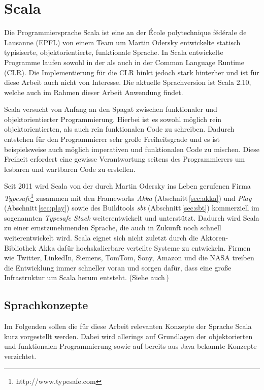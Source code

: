 \section{Scala}

Die Programmiersprache Scala ist eine an der École polytechnique fédérale de Lausanne (EPFL) von
einem Team um Martin Odersky entwickelte statisch typisiserte,  objektorientierte, funktionale
Sprache. In Scala entwickelte Programme laufen  sowohl in der  als auch in der Common
Language Runtime (CLR). Die Implementierung für die CLR hinkt jedoch stark  hinterher und ist für
diese Arbeit auch nicht von Interesse. Die aktuelle Sprachversion ist Scala 2.10, welche auch im
Rahmen dieser Arbeit Anwendung findet.

Scala versucht von Anfang an den Spagat zwischen funktionaler und  objektorientierter
Programmierung. Hierbei ist es sowohl möglich  rein objektorientierten, als auch rein funktionalen
Code zu schreiben. Dadurch  entstehen für den Programmierer sehr große Freiheitsgrade und es ist
beispielsweise auch möglich imperativen und funktionalen Code zu mischen. Diese  Freiheit erfordert
eine gewisse Verantwortung seitens des Programmierers um  lesbaren und wartbaren Code zu erstellen.

Seit 2011 wird Scala von der durch Martin Odersky ins Leben gerufenen Firma
\textit{Typesafe}\footnote{http://www.typesafe.com} zusammen mit den Frameworks \textit{Akka}
(Abschnitt\,\ref{sec:akka}) und \textit{Play} (Abschnitt\,\ref{sec:play}) sowie des Buildtools
\textit{sbt} (Abschnitt\,\ref{sec:sbt}) kommerziell im sogenannten \textit{Typesafe Stack}
weiterentwickelt und unterstützt. Dadurch wird Scala zu einer ernstzunehmenden Sprache, die auch in
Zukunft noch schnell weiterentwickelt wird. Scala eignet sich nicht zuletzt durch die Aktoren-
Bibliothek Akka dafür hochskalierbare verteilte Systeme zu entwickeln. Firmen wie Twitter, LinkedIn,
Siemens, TomTom, Sony, Amazon und die NASA treiben die Entwicklung immer schneller voran und sorgen
dafür, dass eine große Infrastruktur um Scala herum entsteht. (Siehe auch\,\cite{scala})

\subsection{Sprachkonzepte}

Im Folgenden sollen die für diese Arbeit relevanten Konzepte der Sprache Scala kurz vorgestellt
werden. Dabei wird allerings auf Grundlagen der objektorierten und funktionalen Programmierung sowie
auf bereits aus Java bekannte Konzepte verzichtet.

